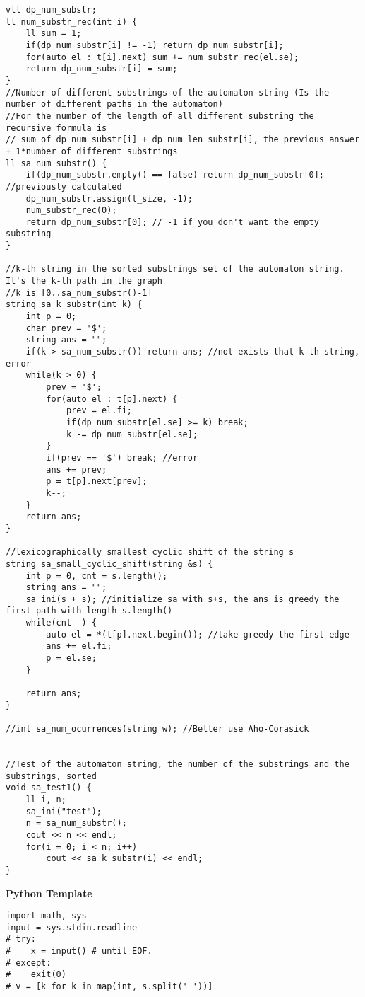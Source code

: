 \documentclass[a4paper,10pt]{article}
\newcommand{\titleAlg}[1]{\vspace{-10pt}
\begin{center}\textbf{#1}\end{center} \vspace{-10pt}}
\begin{document}
\begin{multicols}{2}
\begin{verbatim}
vll dp_num_substr;
ll num_substr_rec(int i) {
    ll sum = 1;
    if(dp_num_substr[i] != -1) return dp_num_substr[i];
    for(auto el : t[i].next) sum += num_substr_rec(el.se);
    return dp_num_substr[i] = sum;
}
//Number of different substrings of the automaton string (Is the number of different paths in the automaton)
//For the number of the length of all different substring the recursive formula is 
// sum of dp_num_substr[i] + dp_num_len_substr[i], the previous answer + 1*number of different substrings
ll sa_num_substr() {
    if(dp_num_substr.empty() == false) return dp_num_substr[0]; //previously calculated
    dp_num_substr.assign(t_size, -1);
    num_substr_rec(0);
    return dp_num_substr[0]; // -1 if you don't want the empty substring
}

//k-th string in the sorted substrings set of the automaton string. It's the k-th path in the graph
//k is [0..sa_num_substr()-1]
string sa_k_substr(int k) {
    int p = 0;
    char prev = '$';
    string ans = "";
    if(k > sa_num_substr()) return ans; //not exists that k-th string, error
    while(k > 0) {
        prev = '$';
        for(auto el : t[p].next) {
            prev = el.fi;
            if(dp_num_substr[el.se] >= k) break;
            k -= dp_num_substr[el.se];
        }
        if(prev == '$') break; //error
        ans += prev;
        p = t[p].next[prev];
        k--;
    }
    return ans;
}

//lexicographically smallest cyclic shift of the string s
string sa_small_cyclic_shift(string &s) {
    int p = 0, cnt = s.length();
    string ans = "";
    sa_ini(s + s); //initialize sa with s+s, the ans is greedy the first path with length s.length()
    while(cnt--) {
        auto el = *(t[p].next.begin()); //take greedy the first edge
        ans += el.fi;
        p = el.se;
    }

    return ans;
}

//int sa_num_ocurrences(string w); //Better use Aho-Corasick


//Test of the automaton string, the number of the substrings and the substrings, sorted
void sa_test1() {
    ll i, n;
    sa_ini("test");
    n = sa_num_substr();
    cout << n << endl;
    for(i = 0; i < n; i++)
        cout << sa_k_substr(i) << endl;
}

\end{verbatim}
\end{multicols}

\titleAlg{Python Template}
\begin{multicols}{2}
\begin{verbatim}
import math, sys
input = sys.stdin.readline
# try:
#    x = input() # until EOF.
# except:
#    exit(0)
# v = [k for k in map(int, s.split(' '))]


\end{verbatim}
\end{multicols}
\end{document}
